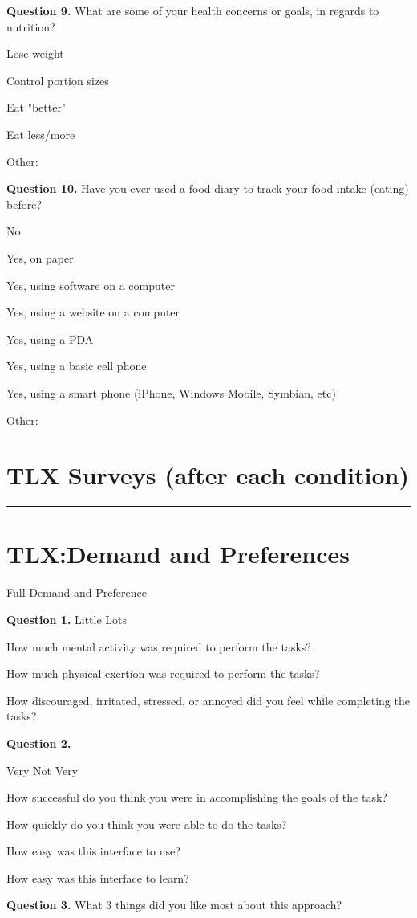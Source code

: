 \noindent\textbf{Question 9.}
What are some of your health concerns or goals, in regards to nutrition?

\begin{itemize*}
\item	Lose weight
\item	Control portion sizes
\item	Eat "better"
\item	Eat less/more
\item	Other:  
\end{itemize*}

\noindent\textbf{Question 10.}
Have you ever used a food diary to track your food intake (eating) before?

\begin{itemize*}
\item	No
\item	Yes, on paper
\item	Yes, using software on a computer
\item	Yes, using a website on a computer
\item	Yes, using a PDA
\item	Yes, using a basic cell phone
\item	Yes, using a smart phone (iPhone, Windows Mobile, Symbian, etc)
\item	Other:  
\end{itemize*}

\section{TLX Surveys (after each condition)}
\hrule 
\section{TLX:Demand and Preferences}
Full
Demand and Preference


\noindent\textbf{Question 1.}
 	Little						Lots
\begin{itemize*}
\item How much mental activity was required to perform the tasks?
\item How much physical exertion was required to perform the tasks?
\item How discouraged, irritated, stressed, or annoyed did you feel while completing the tasks?
\end{itemize*}

\noindent\textbf{Question 2.}


 	Very						Not Very
\begin{itemize*}
\item How successful do you think you were in accomplishing the goals of the task?
\item How quickly do you think you were able to do the tasks?
\item How easy was this interface to use?
\item How easy was this interface to learn?
\end{itemize*}
\noindent\textbf{Question 3.}
What 3 things did you like most about this approach? 
 

